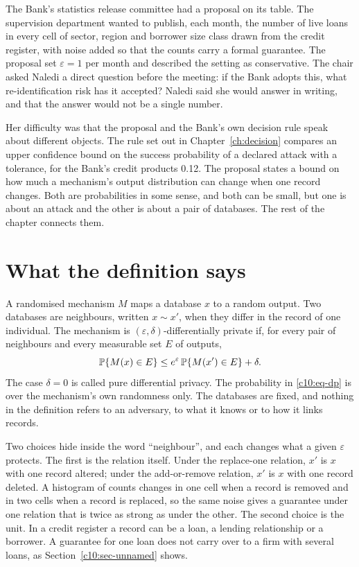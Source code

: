 The Bank's statistics release committee had a proposal on its table. The
supervision department wanted to publish, each month, the number of live loans in
every cell of sector, region and borrower size class drawn from the credit
register, with noise added so that the counts carry a formal guarantee. The
proposal set $\varepsilon = 1$ per month and described the setting as
conservative. The chair asked Naledi a direct question before the meeting: if the
Bank adopts this, what re-identification risk has it accepted? Naledi said she
would answer in writing, and that the answer would not be a single number.

Her difficulty was that the proposal and the Bank's own decision rule speak about
different objects. The rule set out in Chapter~\ref{ch:decision} compares an upper
confidence bound on the success probability of a declared attack with a
tolerance, for the Bank's credit products 0.12.
The proposal states a bound on how much a mechanism's output distribution can
change when one record changes. Both are probabilities in some sense, and both
can be small, but one is about an attack and the other is about a pair of
databases. The rest of the chapter connects them.

\section{What the definition says}

A randomised mechanism $M$ maps a database $x$ to a random output. Two databases
are neighbours, written $x \sim x'$, when they differ in the record of one
individual. The mechanism is $(\varepsilon,\delta)$-differentially private
\citep{dwork2006a,dwork2006b,dwork2014} if, for every pair of neighbours and every
measurable set $E$ of outputs,
\begin{equation}\label{c10:eq-dp}
\mathbb{P}\{M(x) \in E\} \le e^{\varepsilon}\,\mathbb{P}\{M(x') \in E\} + \delta .
\end{equation}
The case $\delta = 0$ is called pure differential privacy. The probability in
\eqref{c10:eq-dp} is over the mechanism's own randomness only. The databases are
fixed, and nothing in the definition refers to an adversary, to what it knows or
to how it links records.

Two choices hide inside the word ``neighbour'', and each changes what a given
$\varepsilon$ protects. The first is the relation itself. Under the replace-one
relation, $x'$ is $x$ with one record altered; under the add-or-remove relation,
$x'$ is $x$ with one record deleted. A histogram of counts changes in one cell
when a record is removed and in two cells when a record is replaced, so the same
noise gives a guarantee under one relation that is twice as strong as under the
other. The second choice is the unit. In a credit register a record can be a
loan, a lending relationship or a borrower. A guarantee for one loan does not
carry over to a firm with several loans, as Section~\ref{c10:sec-unnamed} shows.

